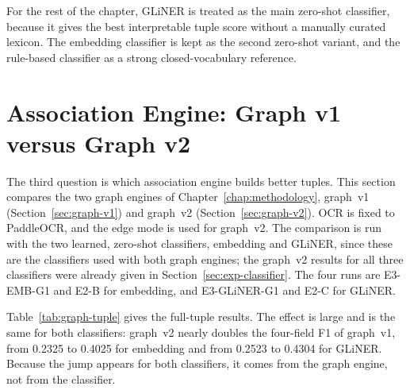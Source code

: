 For the rest of the chapter, GLiNER is treated as the main zero-shot
classifier, because it gives the best interpretable tuple score without a
manually curated lexicon. The embedding classifier is kept as the second
zero-shot variant, and the rule-based classifier as a strong
closed-vocabulary reference.



\section{Association Engine: Graph v1 versus Graph v2}\label{sec:exp-assoc}

The third question is which association engine builds better tuples. This
section compares the two graph engines of Chapter~\ref{chap:methodology},
graph~v1 (Section~\ref{sec:graph-v1}) and graph~v2
(Section~\ref{sec:graph-v2}). OCR is fixed to PaddleOCR, and the
 edge mode is used for graph~v2. The comparison is run with
the two learned, zero-shot classifiers, embedding and GLiNER, since these
are the classifiers used with both graph engines; the graph~v2 results for
all three classifiers were already given in Section~\ref{sec:exp-classifier}.
The four runs are E3-EMB-G1 and E2-B for embedding, and E3-GLiNER-G1 and
E2-C for GLiNER.

Table~\ref{tab:graph-tuple} gives the full-tuple results. The effect is
large and is the same for both classifiers: graph~v2 nearly doubles the
four-field F1 of graph~v1, from 0.2325 to 0.4025 for embedding and from
0.2523 to 0.4304 for GLiNER. Because the jump appears for both classifiers,
it comes from the graph engine, not from the classifier.

